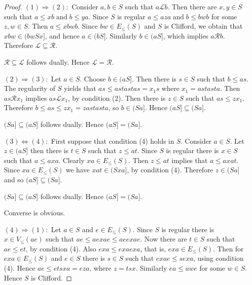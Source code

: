 \documentclass[13pt]{article}
\theoremstyle{definition}
\theoremstyle{remark}
\numberwithin{equation}{section}
\newcommand{\lc}{\mathcal{L}}
\newcommand{\rc}{\mathcal{R}}
\begin{document}
\begin{proof}
$(1)\Rightarrow(2):$ Consider $a, b \in S$ such that $a \lc b$. Then
there are $x, y \in S$ such that $a \leq xb \;\textrm{and} \;b\leq
ya$. Since $S$ is regular $a \leq aza \;\textrm{and} \; b \leq bwb$
for some $z,w \in S$. Then $a \leq xbwb$. Since  $bw \in E_\leq(S)$
and  $S$ is  Clifford,  we obtain that $xbw \in (bw S x]$, and hence
$a \in (bS]$. Similarly  $b \in (aS]$, which implies  $a \rc b$.
Therefore $\lc \subseteq \rc$.

$\rc \subseteq \lc$ follows dually. Hence $\lc= \rc$.

$(2)\Rightarrow (3):$  Let $a \in S$. Choose $b \in (aS]$.  Then
there is $s \in S$ such that $b\leq as$. The regularity  of $S$
yields that $as \leq ast ast as= x_1 s$ where $x_1= ast ast a$. Then
$as \rc x_1$ implies  $as \lc x_1$, by condition (2). Then there is
$z \in S$ such that $as \leq zx_1$. Therefore $b \leq as \leq zx_1=
zast ast a$, so $b \in (Sa]$. Hence  $(aS] \subseteq (Sa]$.

$(Sa] \subseteq (aS]$ follows dually. Hence $(aS] =(Sa]$.


$(3)\Leftrightarrow (4):$    First suppose that condition (4) holds
in $S$. Consider $a\in S$. Let $z\in (aS]$ then there is $t \in S$
such that $z\leq at$. Since $S$ is regular there is $x \in S$ such
that $a \leq axa$. Clearly $xa \in E_\leq(S)$. Then  $z \leq at$
implies that $a \leq axat$. Since $xa \in E_\leq(S)$ we have $xat\in
(Sxa]$, by condition (4). Therefore $z \in (Sa]$ and so $(aS]
\subseteq (Sa]$.

$(Sa] \subseteq (aS]$ follows dually. Hence $(aS] = (Sa]$.

Converse is obvious.



$(4)\Rightarrow (1):$  Let $a \in S$ and $e \in E_\leq(S)$. Since
$S$ is regular there is $x \in V_\leq(ae)$ such that $ae\leq ae
xae\leq aee xae$. Now there  are $t \in S$ such that $ae\leq et$, by
 condition (4). Also $exa \leq exaexa$, that is, $exa \in E_\leq(S)$.
Then for $exa \in E_\leq(S)$ and $e \in S$ there is $s\in S$ such
that $exae \leq sexa$, using condition (4).  Hence $ae \leq etsxa= e
za$, where $z= tsx$. Similarly $ea \leq awe$ for some $w \in S$.
Hence $S$ is Clifford.
\end{proof}
\end{document}
